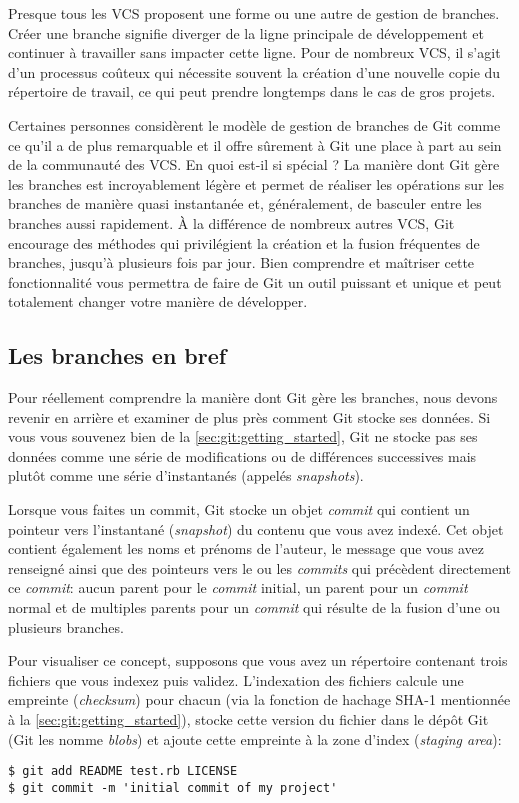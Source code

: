 Presque tous les VCS proposent une forme ou une autre de gestion de branches.
Créer une branche signifie diverger de la ligne principale de développement et continuer à travailler sans impacter cette ligne.
Pour de nombreux VCS, il s'agit d'un processus coûteux qui nécessite souvent la création d'une nouvelle copie du répertoire de travail, ce qui peut prendre longtemps dans le cas de gros projets.

Certaines personnes considèrent le modèle de gestion de branches de Git comme ce qu'il a de plus remarquable et il offre sûrement à Git une place à part au sein de la communauté des VCS.
En quoi est-il si spécial ?
La manière dont Git gère les branches est incroyablement légère et permet de réaliser les opérations sur les branches de manière quasi instantanée et, généralement, de basculer entre les branches aussi rapidement.
À la différence de nombreux autres VCS, Git encourage des méthodes qui privilégient la création et la fusion fréquentes de branches, jusqu'à plusieurs fois par jour.
Bien comprendre et maîtriser cette fonctionnalité vous permettra de faire de Git un outil puissant et unique et peut totalement changer votre manière de développer.

\subsection{Les branches en bref}
\label{sec:git:branches_overview}

Pour réellement comprendre la manière dont Git gère les branches, nous devons revenir en arrière et examiner de plus près comment Git stocke ses données.
Si vous vous souvenez bien de la \autoref{sec:git:getting_started}, Git ne stocke pas ses données comme une série de modifications ou de différences successives mais plutôt comme une série d'instantanés (appelés \emph{snapshots}).

Lorsque vous faites un commit, Git stocke un objet \emph{commit} qui contient un pointeur vers l'instantané (\emph{snapshot}) du contenu que vous avez indexé.
Cet objet contient également les noms et prénoms de l'auteur, le message que vous avez renseigné ainsi que des pointeurs vers le ou les \emph{commits} qui précèdent directement ce \emph{commit}: aucun parent pour le \emph{commit} initial, un parent pour un \emph{commit} normal et de multiples parents pour un \emph{commit} qui résulte de la fusion d'une ou plusieurs branches.

Pour visualiser ce concept, supposons que vous avez un répertoire contenant trois fichiers que vous indexez puis validez.
L'indexation des fichiers calcule une empreinte (\emph{checksum}) pour chacun (via la fonction de hachage SHA-1 mentionnée à la \autoref{sec:git:getting_started}), stocke cette version du fichier dans le dépôt Git (Git les nomme \emph{blobs}) et ajoute cette empreinte à la zone d'index (\emph{staging area}):
\begin{Schunk}
\begin{Verbatim}
$ git add README test.rb LICENSE
$ git commit -m 'initial commit of my project'
\end{Verbatim}
\end{Schunk}


